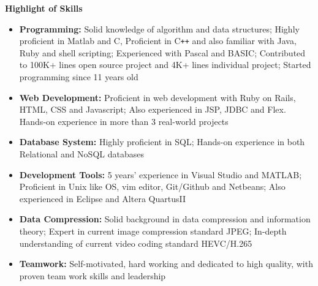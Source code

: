 \documentclass[letterpaper,10pt]{article}
\newcommand{\resheading}[1]{{\large \colorbox{mygrey}{\begin{minipage}{\textwidth}{\textbf{#1 \vphantom{p\^{E}}}}\end{minipage}}}}
\begin{document}
\resheading{Highlight of Skills}
\begin{itemize}
\itemsep0em
\item {\textbf {Programming:}} Solid knowledge of algorithm and data structures; Highly proficient in Matlab and C, Proficient in C{}\verb!++! and also familiar with Java, Ruby and shell scripting; Experienced with Pascal and BASIC; Contributed to 100K+ lines open source project and 4K+ lines individual project; Started programming since 11 years old
\item{\textbf {Web Development:}} Proficient in web development with Ruby on Rails, HTML, CSS and Javascript; Also experienced in JSP, JDBC and Flex. Hands-on experience in more than 3 real-world projects
\item{\textbf {Database System:}} Highly proficient in SQL; Hands-on experience in both Relational and NoSQL databases
\item{\textbf {Development Tools:}} 5 years' experience in Visual Studio and MATLAB; Proficient in Unix like OS, vim editor, Git/Github and Netbeans; Also experienced in Eclipse and Altera QuartusII
\item{\textbf {Data Compression:}} Solid background in data compression and information theory; Expert in current image compression standard JPEG; In-depth understanding of current video coding standard HEVC/H.265
\item{\textbf {Teamwork:}} Self-motivated, hard working and dedicated to high quality, with proven team work skills and leadership

\end{itemize}
\end{document}
